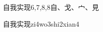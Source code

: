 \begin{entry}{自我实现}{6,7,8,8}{⾃、⼽、⼧、⾒}
  \begin{phonetics}{自我实现}{zi4wo3shi2xian4}
  \end{phonetics}
\end{entry}
